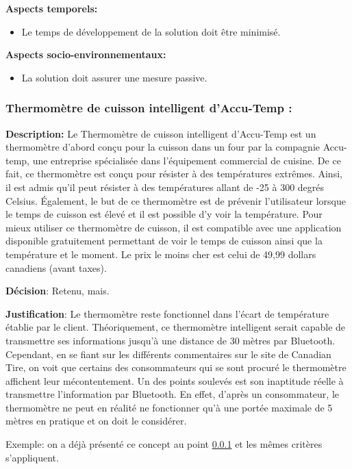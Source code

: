 \textbf{Aspects temporels:}
\begin{itemize}[label = {--}]
    \item Le temps de développement de la solution doit être minimisé.
\end{itemize}

\textbf{Aspects socio-environnementaux:}
\begin{itemize}[label = {--}]
    \item La solution doit assurer une mesure passive.
\end{itemize}

\subsubsection{Thermomètre de cuisson intelligent d’Accu-Temp :}
\label{subsubsection:accu-temp}

\textbf{Description:} Le Thermomètre de cuisson intelligent d’Accu-Temp est un thermomètre d’abord conçu pour la cuisson dans un four par la compagnie Accu-temp, une entreprise spécialisée dans l’équipement commercial de cuisine. De ce fait, ce thermomètre est conçu pour résister à des températures extrêmes. Ainsi, il est admis qu’il peut résister à des températures allant de -25 à 300 degrés Celsius. Également, le but de ce thermomètre est de prévenir l’utilisateur lorsque le temps de cuisson est élevé et il est possible d’y voir la température. Pour mieux utiliser ce thermomètre de cuisson, il est compatible avec une application disponible gratuitement permettant de voir le temps de cuisson ainsi que la température et le moment. Le prix le moins cher est celui de 49,99 dollars canadiens (avant taxes).

\textbf{Décision}: Retenu, mais.

\textbf{Justification}: Le thermomètre reste fonctionnel dans l’écart de température établie par le client. Théoriquement, ce thermomètre intelligent serait capable de transmettre ses informations jusqu’à une distance de 30 mètres par Bluetooth. Cependant, en se fiant sur les différents commentaires sur le site de Canadian Tire, on voit que certains des consommateurs qui se sont procuré le thermomètre affichent leur mécontentement. Un des points soulevés est son inaptitude réelle à transmettre l’information par Bluetooth. En effet, d'après un consommateur, le thermomètre ne peut en réalité ne fonctionner qu’à une portée maximale de 5 mètres en pratique et on doit le considérer.

Exemple: on a déjà présenté ce concept au point \ref{subsubsection:accu-temp} et les mêmes critères s'appliquent.

